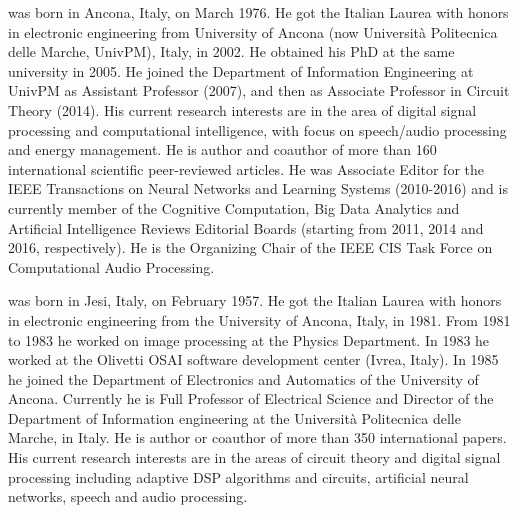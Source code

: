 \documentclass[review]{elsarticle}
\begin{document}
 was born in Ancona, Italy, on March 1976. He got the Italian Laurea with honors in electronic engineering from University of Ancona (now Universit\`{a} Politecnica delle Marche, UnivPM), Italy, in 2002. He obtained his PhD at the same university in 2005. He joined the Department of Information Engineering at UnivPM as Assistant Professor (2007), and then as Associate Professor in Circuit Theory (2014). His current research interests are in the area of digital signal processing and computational intelligence, with focus on speech/audio processing and energy management. He is author and coauthor of more than 160 international scientific peer-reviewed articles. He was Associate Editor for the IEEE Transactions on Neural Networks and Learning Systems (2010-2016) and is currently member of the Cognitive Computation, Big Data Analytics and Artificial Intelligence Reviews Editorial Boards (starting from 2011, 2014 and 2016, respectively). He is the Organizing Chair of the IEEE CIS Task Force on Computational Audio Processing.
\vspace{1cm}

 was born in Jesi, Italy, on February 1957. He got the Italian Laurea with honors in electronic engineering from the University of Ancona, Italy, in 1981. From 1981 to 1983 he worked on image processing at the Physics Department. In 1983 he worked at the Olivetti OSAI software development center (Ivrea, Italy). In 1985 he joined the Department of Electronics and Automatics of the University of Ancona. Currently he is Full Professor of Electrical Science and Director of the Department of Information engineering at the Universit\`{a}  Politecnica delle Marche, in Italy.
He is author or coauthor of more than 350 international papers. His current research interests are in the areas of circuit theory and digital signal processing including adaptive DSP algorithms and circuits, artificial neural networks, speech and audio processing. 
\end{document}
